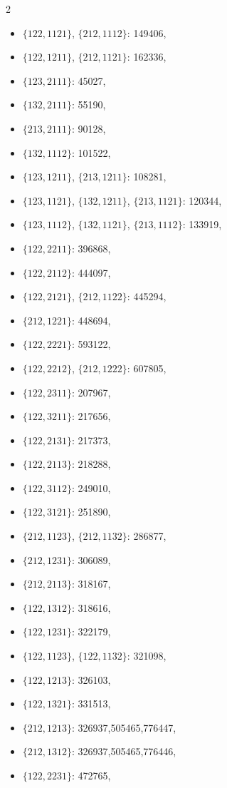 \documentclass[11pt]{amsart}
\theoremstyle{plain}
\theoremstyle{definition}
\begin{document}
{\begin{multicols}{2}
\begin{itemize}
\item[$\blacksquare$] {$\{122,1121\}$, $\{212,1112\}$}: 149406,
\item[$\blacksquare$] {$\{122,1211\}$, $\{212,1121\}$}: 162336,
\item $\{123,2111\}$: 45027,
\item $\{132,2111\}$: 55190,
\item $\{213,2111\}$: 90128,
\item $\{132,1112\}$: 101522,
\item[$\blacksquare$] {$\{123,1211\}$, $\{213,1211\}$}: 108281,
\item[$\blacksquare$] {$\{123,1121\}$, $\{132,1211\}$, $\{213,1121\}$}: 120344,
\item[$\blacksquare$] {$\{123,1112\}$, $\{132,1121\}$, $\{213,1112\}$}: 133919,
\item $\{122,2211\}$: 396868,
\item $\{122,2112\}$: 444097,
\item[$\blacksquare$] {$\{122,2121\}$, $\{212,1122\}$}: 445294,
\item $\{212,1221\}$: 448694,
\item $\{122,2221\}$: 593122,
\item[$\blacksquare$] $\{122,2212\}$, $\{212,1222\}$: 607805,
\item $\{122,2311\}$: 207967,
\item $\{122,3211\}$: 217656,
\item $\{122,2131\}$: 217373,
\item $\{122,2113\}$: 218288,
\item $\{122,3112\}$: 249010,
\item $\{122,3121\}$: 251890,
\item[$\blacksquare$] {$\{212,1123\}$, $\{212,1132\}$}: 286877,
\item $\{212,1231\}$: 306089,
\item $\{212,2113\}$: 318167,
\item $\{122,1312\}$: 318616,
\item $\{122,1231\}$: 322179,
\item[$\blacksquare$] {$\{122,1123\}$, $\{122,1132\}$}: 321098,
\item $\{122,1213\}$: 326103,
\item $\{122,1321\}$: 331513,
\item $\{212,1213\}$: 326937,505465,776447,
\item $\{212,1312\}$: 326937,505465,776446,
\item $\{122,2231\}$: 472765,

\end{itemize}
\end{multicols}}
\end{document}
